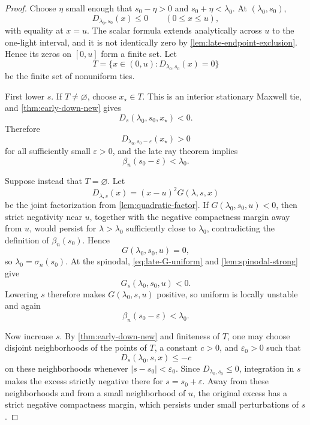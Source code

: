 \documentclass[11pt]{article}
\theoremstyle{plain}
\theoremstyle{definition}
\theoremstyle{remark}
\begin{document}
\begin{proof}
Choose \(\eta\) small enough that \(s_0-\eta>0\) and \(s_0+\eta<\lambda_0\).  At \((\lambda_0,s_0)\),
\[
D_{\lambda_0,s_0}(x)\le0
\qquad(0\le x\le u),
\]
with equality at \(x=u\).  The scalar formula extends analytically across \(u\) to the one-light interval, and it is not identically zero by \cref{lem:late-endpoint-exclusion}.  Hence its zeros on \([0,u]\) form a finite set.  Let
\[
T=\{x\in(0,u):D_{\lambda_0,s_0}(x)=0\}
\]
be the finite set of nonuniform ties.

First lower \(s\).  If \(T\ne\varnothing\), choose \(x_\star\in T\).  This is an interior stationary Maxwell tie, and \cref{thm:early-down-new} gives
\[
D_s(\lambda_0,s_0,x_\star)<0.
\]
Therefore
\[
D_{\lambda_0,s_0-\varepsilon}(x_\star)>0
\]
for all sufficiently small \(\varepsilon>0\), and the late ray theorem implies
\[
\beta_n(s_0-\varepsilon)<\lambda_0.
\]

Suppose instead that \(T=\varnothing\).  Let
\[
D_{\lambda,s}(x)=(x-u)^2G(\lambda,s,x)
\]
be the joint factorization from \cref{lem:quadratic-factor}.  If \(G(\lambda_0,s_0,u)<0\), then strict negativity near \(u\), together with the negative compactness margin away from \(u\), would persist for \(\lambda>\lambda_0\) sufficiently close to \(\lambda_0\), contradicting the definition of \(\beta_n(s_0)\).  Hence
\[
G(\lambda_0,s_0,u)=0,
\]
so \(\lambda_0=\sigma_n(s_0)\).  At the spinodal, \eqref{eq:late-G-uniform} and \cref{lem:spinodal-strong} give
\[
G_s(\lambda_0,s_0,u)<0.
\]
Lowering \(s\) therefore makes \(G(\lambda_0,s,u)\) positive, so uniform is locally unstable and again
\[
\beta_n(s_0-\varepsilon)<\lambda_0.
\]

Now increase \(s\).  By \cref{thm:early-down-new} and finiteness of \(T\), one may choose disjoint neighborhoods of the points of \(T\), a constant \(c>0\), and \(\varepsilon_0>0\) such that
\[
D_s(\lambda_0,s,x)\le-c
\]
on these neighborhoods whenever \(|s-s_0|<\varepsilon_0\).  Since \(D_{\lambda_0,s_0}\le0\), integration in \(s\) makes the excess strictly negative there for \(s=s_0+\varepsilon\).  Away from these neighborhoods and from a small neighborhood of \(u\), the original excess has a strict negative compactness margin, which persists under small perturbations of \(s\).


\end{proof}
\end{document}
